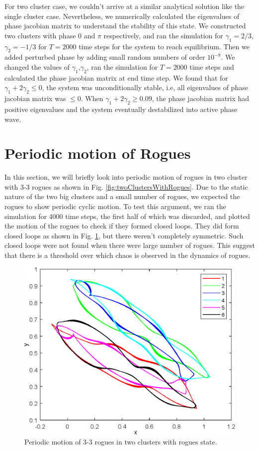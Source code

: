 \documentclass[twocolumn,10pt]{asme2ej}
\begin{document}
{{        For two cluster case, we couldn't arrive at a similar analytical solution like the single cluster case. Nevertheless, we numerically calculated the eigenvalues of phase jacobian matrix to understand the stability of this state. We constructed two clusters with phase \(0\) and \(\pi\) respectively, and ran the simulation for \(\gamma_1 = 2/3\), \(\gamma_2 = -1/3\) for \(T = 2000\) time steps for the system to reach equilibrium. Then we added perturbed phase by adding small random numbers of order \(10^{-8}\). We changed the values of \(\gamma_1\),\(\gamma_2\), ran the simulation for \(T = 2000\) time steps and calculated the phase jacobian matrix at end time step. We found that for \(\gamma_1 + 2\gamma_2 \leq 0\), the system was unconditionally stable, i.e, all eigenvalues of phase jacobian matrix was \(\leq 0\). When \(\gamma_1 + 2\gamma_2 \geq 0.09\), the phase jacobian matrix had positive eigenvalues and the system eventually destabilized into active phase wave. 
    }
}

\section{Periodic motion of Rogues}
{
    In this section, we will briefly look into periodic motion of rogues in two cluster with 3-3 rogues as shown in Fig. \ref{fig:twoClustersWithRogues}. Due to the static nature of the two big clusters and a small number of rogues, we expected the rogues to show periodic cyclic motion. To test this argument, we ran the simulation for 4000 time steps, the first half of which was discarded, and plotted the motion of the rogues to check if they formed closed loops. They did form closed loops as shown in Fig. \ref{fig:cyclicMotion}, but there weren't completely symmetric. Such closed loops were not found when there were large number of rogues. This suggest that there is a threshold over which chaos is observed in the dynamics of rogues. 
    
    \begin{figure}[h!]
        \includegraphics[width = \linewidth]{cyclicMotion.eps}
        \caption{Periodic motion of 3-3 rogues in two clusters with rogues state.}
        \label{fig:cyclicMotion}
    \end{figure}
}
\end{document}
